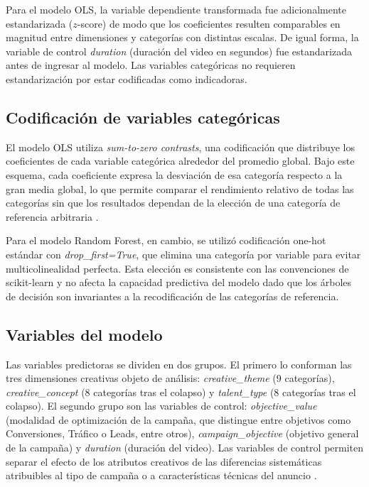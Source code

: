 \documentclass[12pt, a4paper]{report}
\begin{document}
Para el modelo OLS, la variable dependiente transformada fue adicionalmente estandarizada
($z$-score) de modo que los coeficientes resulten comparables en magnitud entre dimensiones y
categorías con distintas escalas. De igual forma, la variable de control \textit{duration}
(duración del video en segundos) fue estandarizada antes de ingresar al modelo. Las variables
categóricas no requieren estandarización por estar codificadas como indicadoras.

\subsection*{Codificación de variables categóricas}

El modelo OLS utiliza \textit{sum-to-zero contrasts}, una codificación que distribuye los
coeficientes de cada variable categórica alrededor del promedio global. Bajo
este esquema, cada coeficiente expresa la desviación de esa categoría respecto a la gran media
global, lo que permite comparar el rendimiento relativo de todas las categorías sin que los
resultados dependan de la elección de una categoría de referencia arbitraria
\citep[Cap.~8]{fox2016}.

Para el modelo Random Forest, en cambio, se utilizó codificación one-hot estándar con
\textit{drop\_first=True}, que elimina una categoría por variable para evitar multicolinealidad
perfecta. Esta elección es consistente con las convenciones de scikit-learn y no afecta la
capacidad predictiva del modelo dado que los árboles de decisión son invariantes a la
recodificación de las categorías de referencia.

\subsection*{Variables del modelo}

Las variables predictoras se dividen en dos grupos. El primero lo conforman las tres dimensiones
creativas objeto de análisis: \textit{creative\_theme} (9 categorías), \textit{creative\_concept}
(8 categorías tras el colapso) y \textit{talent\_type} (8 categorías tras el colapso). El segundo
grupo son las variables de control: \textit{objective\_value} (modalidad de optimización de la
campaña, que distingue entre objetivos como Conversiones, Tráfico o Leads, entre otros),
\textit{campaign\_objective} (objetivo general de la campaña) y \textit{duration} (duración del
video). Las variables de control permiten separar el efecto de los atributos creativos de las
diferencias sistemáticas atribuibles al tipo de campaña o a características técnicas del anuncio \citep[cap.~2]{cunningham2021}.
\end{document}

